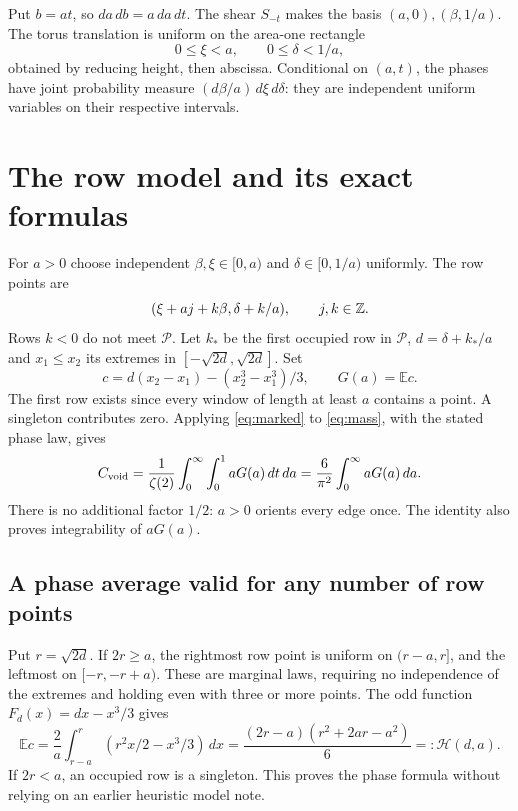 \documentclass[11pt,a4paper]{article}
\newcommand{\E}{\mathbb E}\newcommand{\Prob}{\mathbb P}
\newcommand{\Pcal}{\mathcal P}\newcommand{\Hrow}{\mathcal H}
\theoremstyle{remark}\newtheorem{remark}{Remark}
\numberwithin{equation}{section}
\begin{document}
Put $b=at$, so $da\,db=a\,da\,dt$. The shear $S_{-t}$ makes the basis $(a,0),(\beta,1/a)$. The torus translation is uniform on the area-one rectangle
\[
 0\le\xi<a,\qquad0\le\delta<1/a,
\]
obtained by reducing height, then abscissa. Conditional on $(a,t)$, the phases have joint probability measure $(d\beta/a)\,d\xi\,d\delta$: they are independent uniform variables on their respective intervals.

\section{The row model and its exact formulas}\label{sec:rows}
For $a>0$ choose independent $\beta,\xi\in[0,a)$ and $\delta\in[0,1/a)$ uniformly. The row points are
\begin{equation}\label{eq:rows}
 (\xi+aj+k\beta,\delta+k/a),\qquad j,k\in\mathbb Z.
\end{equation}
Rows $k<0$ do not meet $\Pcal$. Let $k_*$ be the first occupied row in $\Pcal$, $d=\delta+k_*/a$ and $x_1\le x_2$ its extremes in $[-\sqrt{2d},\sqrt{2d}]$. Set
\begin{equation}\label{eq:G}
 c=d(x_2-x_1)-(x_2^3-x_1^3)/3,\qquad G(a)=\E c.
\end{equation}
The first row exists since every window of length at least $a$ contains a point. A singleton contributes zero. Applying \eqref{eq:marked} to \eqref{eq:mass}, with the stated phase law, gives
\begin{equation}\label{eq:identity}
 C_{\mathrm{void}}=\frac1{\zeta(2)}\int_0^\infty\int_0^1aG(a)\,dt\,da
 =\frac6{\pi^2}\int_0^\infty aG(a)\,da.
\end{equation}
There is no additional factor $1/2$: $a>0$ orients every edge once. The identity also proves integrability of $aG(a)$.

\subsection{A phase average valid for any number of row points}
Put $r=\sqrt{2d}$. If $2r\ge a$, the rightmost row point is uniform on $(r-a,r]$, and the leftmost on $[-r,-r+a)$. These are marginal laws, requiring no independence of the extremes and holding even with three or more points. The odd function $F_d(x)=dx-x^3/3$ gives
\begin{equation}\label{eq:H}
 \E c=\frac2a\int_{r-a}^r(r^2x/2-x^3/3)\,dx
 =\frac{(2r-a)(r^2+2ar-a^2)}6=:\Hrow(d,a).
\end{equation}
If $2r<a$, an occupied row is a singleton. This proves the phase formula without relying on an earlier heuristic model note.
\end{document}
